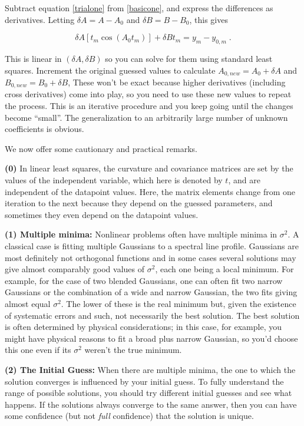 \documentclass[psfig,preprint]{aastex}
\begin{document}
\noindent Subtract equation \ref{trialone} from \ref{basicone}, and
express the differences as derivatives. Letting $\delta A = A - A_0$ and
$\delta B = B - B_0$, this gives

\begin{equation} \label{difference}
\delta A [t_m \cos(A_0 t_m)] + \delta B t_m = y_m - y_{0,m} \; .
\end{equation}

\noindent This is linear in $(\delta A, \delta B)$ so you can solve for
them using standard least squares. Increment the original guessed values
to calculate $A_{0,new}=A_0 + \delta A$ and $B_{0,new}=B_0 + \delta B$,
These won't be exact because higher derivatives (including cross
derivatives) come into play, so you need to use these new values to
repeat the process. This is an iterative procedure and you keep going
until the changes become ``small''. The generalization to an arbitrarily
large number of unknown coefficients is obvious.

	We now offer some cautionary and practical remarks.

	{\bf (0)} In linear least squares, the curvature and covariance
matrices are set by the values of the independent variable, which here
is denoted by $t$, and are independent of the datapoint values. Here,
the matrix elements change from one iteration to the next because they
depend on the guessed parameters, and sometimes they even depend on the
datapoint values. 

	{\bf (1) Multiple minima:} Nonlinear problems often have
multiple minima in $\sigma^2$. A classical case is fitting multiple
Gaussians to a spectral line profile. Gaussians are most definitely not
orthogonal functions and in some cases several solutions may give almost
comparably good values of $\sigma^2$, each one being a local minimum.
For example, for the case of two blended Gaussians, one can often fit
two narrow Gaussians  or the combination of a wide and narrow Gaussian,
the two fits giving almost equal $\sigma^2$. The lower of these is the
real minimum but, given the existence of systematic errors and such, not
necessarily the best solution. The best solution is often determined by
physical considerations; in this case, for example, you might have
physical reasons to fit a broad plus narrow Gaussian, so you'd choose
this one even if its $\sigma^2$ weren't the true minimum.

	{\bf (2) The Initial Guess:} When there are multiple minima,
the one to which the solution converges is influenced by your initial
guess. To fully understand the range of possible solutions, you should
try different initial guesses and see what happens. If the solutions
always converge to the same answer, then you can have some confidence
(but not {\it full} confidence) that the solution is unique.
\end{document}
